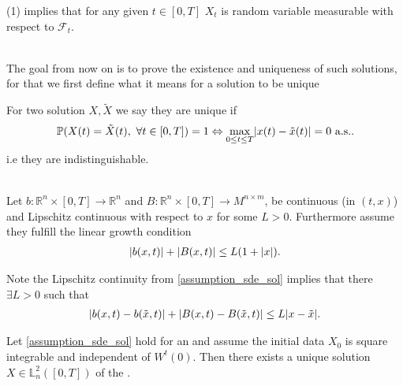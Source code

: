 \begin{remark}
  (1) implies that for any given $t \in  [0,T]$ $X_t$ is random variable measurable with respect to $\mathcal{F}_t$.
\end{remark}
\hspace{0mm}\\
The goal from now on is to prove the existence and uniqueness of such solutions, for that we first define what it means 
for a solution to be unique
\begin{definition}
 For two solution $X,\tilde{X} $ we say they are unique if
 \begin{align*}
   \mathbb{P}(X(t) = \tilde{X}(t), \ \forall  t \in  [0,T] ) = 1 \Leftrightarrow \max_{0\le t \le T} \lvert x(t)-\tilde{x}(t) \rvert  = 0 \text{ a.s.}
 .\end{align*}
 i.e they are indistinguishable.
\end{definition}
\begin{assumption}\label{assumption_sde_sol}\hspace{0mm}\\
  Let $b : \mathbb{R}^{n} \times  [0,T] \to  \mathbb{R}^{n}  $ and 
  $B : \mathbb{R}^{n} \times  [0,T] \to  M^{n \times m}  $,
  be continuous (in $(t,x)$) and Lipschitz continuous with respect to $x$ for some $L > 0$.
  Furthermore assume they fulfill the linear growth condition
  \begin{align*}
    \lvert b(x,t)\rvert + \lvert B(x,t)\rvert \le  L(1+\lvert x\rvert) 
  .\end{align*}
\end{assumption}
\begin{remark}
  Note the Lipschitz continuity from \autoref{assumption_sde_sol} implies that there $\exists L >0$ such that
  \begin{align*}
    \lvert b(x,t) - b(\tilde{x},t )\rvert +  \lvert B(x ,t) - B(\tilde{x},t )\rvert \le  L \lvert x - \tilde{x} \rvert
  .\end{align*}
\end{remark}
\begin{theorem}
  Let \autoref{assumption_sde_sol} hold for an  and assume the initial data $X_0$ is  
  square integrable and independent of $W^{t}(0)$.
  Then there exists a unique solution $X \in  \mathbb{L}^2_n([0,T])$ of the .
\end{theorem}
